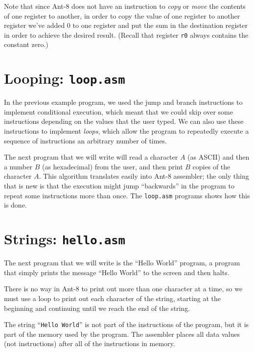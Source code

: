 

Note that since {\sc Ant-8} does not have an instruction to {\em copy} or {\em
move} the contents of one register to another, in order to copy the
value of one register to another register we've added 0 to one
register and put the sum in the destination register in order to
achieve the desired result.  (Recall that register {\tt r0} always
contains the constant zero.)

\section{Looping: {\tt loop.asm}}
\label{loop-sec}

In the previous example program, we used the jump and branch
instructions to implement conditional execution, which meant that we
could skip over some instructions depending on the values that the
user typed.  We can also use these instructions to implement {\em
loops}, which allow the program to repeatedly execute a sequence of
instructions an arbitrary number of times.

The next program that we will write will read a character $A$ (as
{\sc ASCII}) and then a number $B$ (as hexadecimal) from the user, and then
print $B$ copies of the character $A$.  This algorithm translates
easily into {\sc Ant-8} assembler; the only thing that is new is that the
execution might jump ``backwards'' in the program to repeat some
instructions more than once.  The {\tt loop.asm} programs shows how
this is done.




\section{Strings: {\tt hello.asm}}
\label{hello-sec}
\label{load-store-sec}

The next program that we will write is the ``Hello World'' program,
a program that simply prints the message ``Hello World'' to the screen
and then halts.

There is no way in {\sc Ant-8} to print out more than one character at a
time, so we must use a loop to print out each character of the string,
starting at the beginning and continuing until we reach the end of the
string.


The string ``{\tt Hello World}'' is not part of the instructions of
the program, but it is part of the memory used by the program.  The
assembler places all data values (not instructions) after all of the
instructions in memory.

